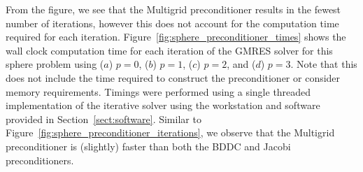 \documentclass[a4paper,12]{elsarticle}
\theoremstyle{definition}
\begin{document}
From the figure, we see that the Multigrid preconditioner results in the fewest number of iterations, however this does not account for the computation time required for each iteration. Figure~\ref{fig:sphere_preconditioner_times} shows the wall clock computation time for each iteration of the GMRES solver for this sphere problem using ($a$) $p=0$, ($b$) $p=1$, ($c$) $p=2$, and ($d$) $p=3$. Note that this does not include the time required to construct the preconditioner or consider memory requirements.
Timings were performed using a single threaded implementation of the iterative solver using the workstation and software provided in Section~\ref{sect:software}. Similar to Figure~\ref{fig:sphere_preconditioner_iterations}, we observe that the Multigrid preconditioner is (slightly) faster than both the BDDC and Jacobi preconditioners. 
\end{document}
